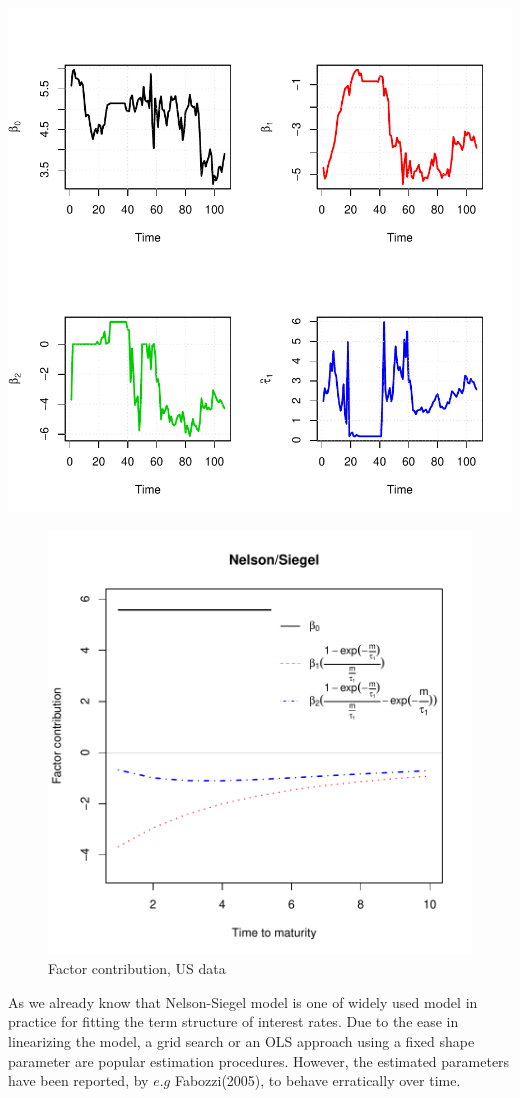 \documentclass{article}
\begin{document}
\begin{spacing}{1.5}
\begin{center}
\includegraphics{Graduation_Paper-011}
\end{center}

\begin{center}
\begin{figure}[htbp]
\includegraphics{Graduation_Paper-012}
\caption{Factor contribution, US data}
\end{figure}
\end{center}
 As we already know that Nelson-Siegel model is one of widely used model in practice for fitting the term structure of interest rates. Due to the ease in linearizing the model, a grid search or an OLS approach using a fixed shape parameter are popular estimation procedures. However, the estimated parameters have been reported, by $\mathit{e.g}$ Fabozzi(2005), to behave erratically over time.


\end{spacing}
\end{document}
